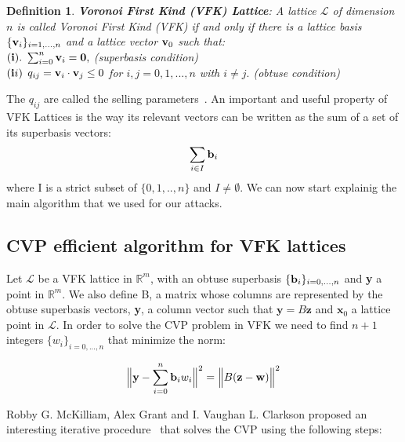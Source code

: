 \documentclass{amsart}
\newtheorem{definition}[theorem]{Definition}
\numberwithin{equation}{section}
\def\L{\mathcal{L}}
\begin{document}
\begin{definition}
\textbf{Voronoi First Kind (VFK) Lattice}: A lattice $\L$ of dimension $n$ is called Voronoi First Kind (VFK) if and only if there is a lattice basis $\{{\textbf v}_i\}_{i=1,...,n}$ and a lattice vector ${\textbf v}_{0}$ such that:\\

$({\textbf i}).$ $\sum_{i=0}^{n}{\textbf v}_i ={\textbf 0}, $ (superbasis condition)\\

$({\textbf ii})$ $q_{ij} = {\textbf v}_i\cdot {\textbf v}_j \leq 0$ for $i,j=0,1,...,n$ with $i\not =j.$ (obtuse condition)
\end{definition}

The $q_{ij}$ are called the selling parameters~\cite{SELLING}. An important and useful property of VFK Lattices is the way its relevant vectors can be written as the sum of a set of its superbasis vectors:
\begin{equation}
\sum_{i\in I}{\textbf b}_i
\label{equation:VFK_REL}
\end{equation}
where I is a strict subset of $ \{ 0,1,..,n \} $ and $I \neq\emptyset$. We can now start explainig the main algorithm that we used for our attacks.

\subsection{CVP efficient algorithm for VFK lattices}

Let $\L$ be a VFK lattice in $\mathbb{R}^m$, with an obtuse superbasis $\{{\textbf b}_i\}_{i=0,...,n}$ 
and \textbf{y} a point in $\mathbb{R}^m$. We also define B, a matrix whose columns are represented 
by the obtuse superbasis vectors, \textbf{y}, a column vector such that $\textbf{y}=B\textbf{z}$ and 
$\textbf{x}_0$ a lattice point in $\L$. In order to solve the CVP problem in VFK we need to find 
$n+1$ integers $\{ w_i\}_{i=0,...,n}$ that minimize the norm:

\begin{equation}
\Big{\|} \textbf{y} - \sum_{i=0}^{n}{\textbf{b}_i w_i} \Big{\|}^2 = \Big{\|} B(\textbf{z}-{\textbf{w}}) \Big{\|}^2\label{equation:VFK_CVP}
\end{equation}

Robby G. McKilliam, Alex Grant and I. Vaughan L. Clarkson proposed an interesting iterative procedure~\cite{VFK-CVP} that solves the CVP using the following steps: \\
\end{document}
